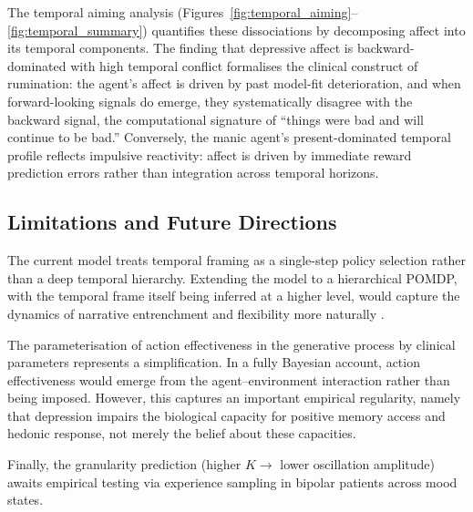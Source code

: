\documentclass[11pt,a4paper]{article}
\begin{document}
The temporal aiming analysis (Figures~\ref{fig:temporal_aiming}--\ref{fig:temporal_summary}) quantifies these dissociations by decomposing affect into its temporal components. The finding that depressive affect is backward-dominated with high temporal conflict formalises the clinical construct of rumination: the agent's affect is driven by past model-fit deterioration, and when forward-looking signals do emerge, they systematically disagree with the backward signal, the computational signature of ``things were bad and will continue to be bad.'' Conversely, the manic agent's present-dominated temporal profile reflects impulsive reactivity: affect is driven by immediate reward prediction errors rather than integration across temporal horizons.

\subsection{Limitations and Future Directions}

The current model treats temporal framing as a single-step policy selection rather than a deep temporal hierarchy. Extending the model to a hierarchical POMDP, with the temporal frame itself being inferred at a higher level, would capture the dynamics of narrative entrenchment and flexibility more naturally \citep{hesp2021deeply}.

The parameterisation of action effectiveness in the generative process by clinical parameters represents a simplification. In a fully Bayesian account, action effectiveness would emerge from the agent--environment interaction rather than being imposed. However, this captures an important empirical regularity, namely that depression impairs the biological capacity for positive memory access and hedonic response, not merely the belief about these capacities.

Finally, the granularity prediction (higher $K \to$ lower oscillation amplitude) awaits empirical testing via experience sampling in bipolar patients across mood states.



\end{document}

